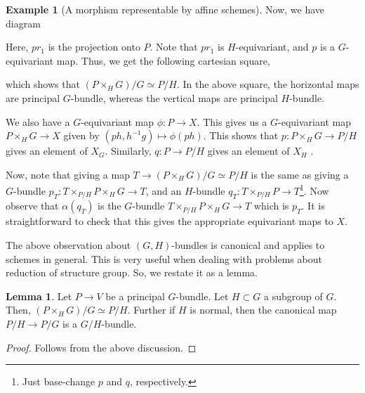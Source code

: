 \documentclass[11pt]{amsart}
\theoremstyle{definition}
\newtheorem{lemma}[theorem]{Lemma}
\newtheorem{example}[theorem]{Example}
\begin{document}
\begin{example}[A morphism representable by affine schemes]
	Now, we have diagram
	\begin{center}
	\end{center}
	Here, $pr_1$ is the projection onto $P$. Note that $pr_1$ is $H$-equivariant, and $p$ is a $G$-equivariant map. Thus, we get the following cartesian square,
	\begin{center}
	\end{center}
	which shows that $(P\times_H G)/G\simeq P/H$. In the above square, the horizontal maps are principal $G$-bundle, whereas the vertical maps are principal $H$-bundle.
	
	We also have a $G$-equivariant map $\phi: P\rightarrow X$. This gives us a $G$-equivariant map $P\times_H G\rightarrow X$ given by $(ph,h^{-1}g)\mapsto \phi(ph)$. This shows that $p:P\times_H G\rightarrow P/H$ gives an element of $X_G$. Similarly, $q: P\rightarrow P/H$ gives an element of $X_H$ .
	
	Now, note that giving a map $T\rightarrow (P\times_H G)/G \simeq P/H$ is the same as giving a $G$-bundle $p_T: T\times_{P/H}P\times_H G \rightarrow T$, and an $H$-bundle $q_T: T\times_{P/H}P\rightarrow T$\footnote{Just base-change $p$ and $q$, respectively.}. Now observe that $\alpha (q_T)$ is the $G$-bundle $T\times_{P/H}P\times_H G\rightarrow T$ which is $p_T$. It is straightforward to check that this gives the appropriate equivariant maps to $X$.
\end{example}

The above observation about $(G,H)$-bundles is canonical and applies to schemes in general. This is very useful when dealing with problems about reduction of structure group. So, we restate it as a lemma.

\begin{lemma}
	Let $P\rightarrow V$ be a principal $G$-bundle. Let $H\subset G$ a subgroup of $G$. Then, $(P\times_H G)/G \simeq P/H$. Further if $H$ is normal, then the canonical map $P/H\rightarrow P/G$ is a $G/H$-bundle.
\end{lemma}
\begin{proof}
	Follows from the above discussion.
\end{proof}
\end{document}
